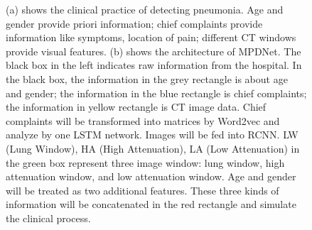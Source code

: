 \documentclass[journal]{IEEEtran}
\begin{document}
\begin{figure}[htbp]
    \centering
    \caption{(a) shows the clinical practice of detecting pneumonia. Age and gender provide priori information; chief complaints provide information like symptoms, location of pain; different CT windows provide visual features. (b) shows the architecture of MPDNet. The black box in the left indicates raw information from the hospital. In the black box, the information in the grey rectangle is about age and gender; the information in the blue rectangle is chief complaints; the information in yellow rectangle is CT image data. Chief complaints will be transformed into matrices by Word2vec and analyze by one LSTM network. Images will be fed into RCNN. LW (Lung Window), HA (High Attenuation), LA (Low Attenuation) in the green box represent three image window: lung window, high attenuation window, and low attenuation window. Age and gender will be treated as two additional features. These three kinds of information will be concatenated in the red rectangle and simulate the clinical process.
    }
    \label{MMDD}
    \end{figure}
\end{document}
